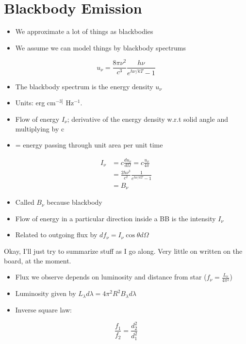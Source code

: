 \documentclass[a4paper]{article} %
\begin{document}
\section{Blackbody Emission}
\begin{itemize}
\item We approximate a lot of things as blackbodies
\item We assume we can model things by blackbody spectrums
\end{itemize}
\begin{equation}
u_\nu=\frac{8\pi\nu^2}{c^3}\frac{h\nu}{e^{h\nu/kT}-1}
\end{equation}
\begin{itemize}
\item The blackbody spectrum is the energy density $u_\nu$
\item Units: erg cm$^{-3]}$ Hz$^{-1}$.
\item Flow of energy $I_\nu$; derivative of the energy density w.r.t solid angle and multiplying by c
\item = energy passing through unit area per unit time
\end{itemize}
\begin{align}
I_\nu&=c\frac{du_\nu}{d\Omega}=c\frac{u_\nu}{4\pi}\\
&=\frac{2h\nu^3}{c^2}\frac{1}{e^{h\nu/kT}-1}\\
&=B_\nu
\end{align}
\begin{itemize}
\item Called $B_\nu$ because blackbody
\item Flow of energy in a particular direction inside a BB is the intensity $I_\nu$
\item Related to outgoing flux by $df_\nu = I_\nu\cos\theta d\Omega$
\end{itemize}
Okay, I'll just try to summarize stuff as I go along. Very little on written on the board, at the moment.

\begin{itemize}
\item Flux we observe depends on luminosity and distance from star ($f_\nu=\frac{L_\nu}{4\pi ^2}$)
\item Luminosity given by $L_\lambda d\lambda=4\pi^2 R^2 B_\lambda d\lambda$
\item Inverse square law:
\end{itemize}
\begin{equation}
\frac{f_1}{f_2}=\frac{d_2^2}{d_1^2}
\end{equation}
\end{document}
